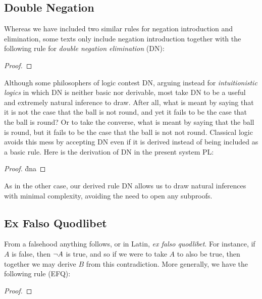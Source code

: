 \subsection{Double Negation}

Whereas we have included two similar rules for negation introduction and elimination, some texts only include negation introduction together with the following rule for \textit{double negation elimination} (DN):

\begin{proof}
\end{proof}

Although some philosophers of logic contest DN, arguing instead for \textit{intuitionistic logics} in which DN is neither basic nor derivable, most take DN to be a useful and extremely natural inference to draw.
After all, what is meant by saying that it is not the case that the ball is not round, and yet it fails to be the case that the ball is round?
Or to take the converse, what is meant by saying that the ball is round, but it fails to be the case that the ball is not not round.
Classical logic avoids this mess by accepting DN even if it is derived instead of being included as a basic rule.
Here is the derivation of DN in the present system PL:

\begin{proof}
  \open 
     \as{}
     \r{dna}
  \close
   
\end{proof}

As in the other case, our derived rule DN allows us to draw natural inferences with minimal complexity, avoiding the need to open any subproofs.




\subsection{Ex Falso Quodlibet}
  \label{EFQ}

From a falsehood anything follows, or in Latin, \textit{ex falso quodlibet}.
For instance, if $A$ is false, then $\neg A$ is true, and so if we were to take $A$ to also be true, then together we may derive $B$ from this contradiction. 
More generally, we have the following rule (EFQ):

\begin{proof}
\end{proof}

